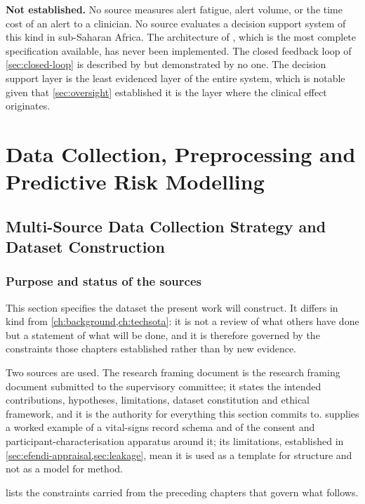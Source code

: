 \documentclass[12pt,a4paper,oneside]{report}
\begin{document}
\textbf{Not established.} No source measures alert fatigue, alert volume, or the time cost of an alert to a clinician. No source evaluates a decision support system of this kind in sub-Saharan Africa. The architecture of \textcite{yazdani2018}, which is the most complete specification available, has never been implemented. The closed feedback loop of \cref{sec:closed-loop} is described by \textcite{liu2025review} but demonstrated by no one. The decision support layer is the least evidenced layer of the entire system, which is notable given that \cref{sec:oversight} established it is the layer where the clinical effect originates.


\chapter{Data Collection, Preprocessing and Predictive Risk Modelling}\label{ch:data}

\section{Multi-Source Data Collection Strategy and Dataset Construction}\label{sec:collection}

\subsection*{Purpose and status of the sources}

This section specifies the dataset the present work will construct. It differs in kind from \cref{ch:background,ch:techsota}: it is not a review of what others have done but a statement of what will be done, and it is therefore governed by the constraints those chapters established rather than by new evidence.

Two sources are used. The research framing document is the research framing document submitted to the supervisory committee; it states the intended contributions, hypotheses, limitations, dataset constitution and ethical framework, and it is the authority for everything this section commits to. \Textcite{efendi2025} supplies a worked example of a vital-signs record schema and of the consent and participant-characterisation apparatus around it; its limitations, established in \cref{sec:efendi-appraisal,sec:leakage}, mean it is used as a template for structure and not as a model for method.

 lists the constraints carried from the preceding chapters that govern what follows.
\end{document}
